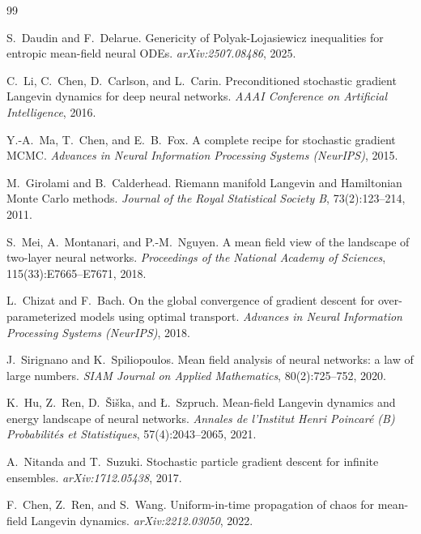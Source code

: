 \documentclass[11pt, a4paper]{article}
\theoremstyle{definition}
\begin{document}
\begin{thebibliography}{99}

S.~Daudin and F.~Delarue.
\newblock Genericity of Polyak-Lojasiewicz inequalities for entropic
mean-field neural ODEs.
\newblock \emph{arXiv:2507.08486}, 2025.

C.~Li, C.~Chen, D.~Carlson, and L.~Carin.
\newblock Preconditioned stochastic gradient Langevin dynamics for deep
neural networks.
\newblock \emph{AAAI Conference on Artificial Intelligence}, 2016.

Y.-A.~Ma, T.~Chen, and E.~B.~Fox.
\newblock A complete recipe for stochastic gradient MCMC.
\newblock \emph{Advances in Neural Information Processing Systems
(NeurIPS)}, 2015.

M.~Girolami and B.~Calderhead.
\newblock Riemann manifold Langevin and Hamiltonian Monte Carlo methods.
\newblock \emph{Journal of the Royal Statistical Society B},
73(2):123--214, 2011.

S.~Mei, A.~Montanari, and P.-M.~Nguyen.
\newblock A mean field view of the landscape of two-layer neural
networks.
\newblock \emph{Proceedings of the National Academy of Sciences},
115(33):E7665--E7671, 2018.

L.~Chizat and F.~Bach.
\newblock On the global convergence of gradient descent for
over-parameterized models using optimal transport.
\newblock \emph{Advances in Neural Information Processing Systems
(NeurIPS)}, 2018.

J.~Sirignano and K.~Spiliopoulos.
\newblock Mean field analysis of neural networks: a law of large numbers.
\newblock \emph{SIAM Journal on Applied Mathematics}, 80(2):725--752,
2020.

K.~Hu, Z.~Ren, D.~\v{S}i\v{s}ka, and {\L}.~Szpruch.
\newblock Mean-field Langevin dynamics and energy landscape of neural
networks.
\newblock \emph{Annales de l'Institut Henri Poincar\'e (B) Probabilit\'es
et Statistiques}, 57(4):2043--2065, 2021.

A.~Nitanda and T.~Suzuki.
\newblock Stochastic particle gradient descent for infinite ensembles.
\newblock \emph{arXiv:1712.05438}, 2017.

F.~Chen, Z.~Ren, and S.~Wang.
\newblock Uniform-in-time propagation of chaos for mean-field Langevin
dynamics.
\newblock \emph{arXiv:2212.03050}, 2022.


\end{thebibliography}
\end{document}
